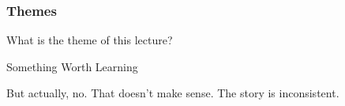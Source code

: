 \documentclass[aspectratio=169, handout]{beamer}
\begin{document}
\begin{frame}[fragile]
  \frametitle{Themes}

  What is the theme of this lecture?

  \pause
  \vspace{\fill}

  \begin{center}
    \large Something Worth Learning
  \end{center}

  \pause
  \vspace{\fill}

  But actually, no. That doesn't make sense. The story is inconsistent.

\end{frame}
\end{document}
